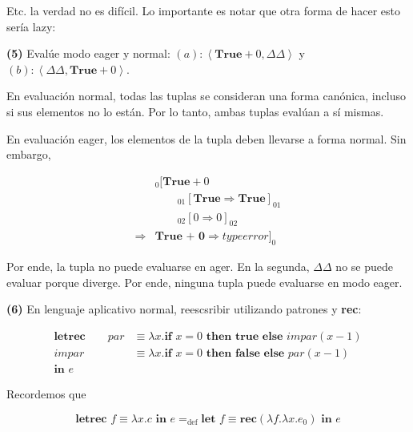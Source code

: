 \documentclass[article, 12pt]{article}
\begin{document}
Etc. la verdad no es difícil. Lo importante es notar que otra forma de hacer
esto sería lazy: 

\pagebreak 

\begin{myframe}
  \textbf{(5)} Evalúe modo eager y normal: $(a) : \left<\textbf{True} + 0, \Delta \Delta
  \right>$ y $(b) : \left<\Delta \Delta, \textbf{True} + 0 \right>$.
\end{myframe}

En evaluación normal, todas las tuplas se consideran una forma canónica, incluso
si sus elementos no lo están. Por lo tanto, ambas tuplas evalúan a sí mismas. 

En evaluación eager, los elementos de la tupla deben llevarse a forma normal.
Sin embargo, 

\begin{align*}
  &_{0}[\textbf{True} + 0 \\ 
  &\qquad _{01}[\textbf{True} \Rightarrow \textbf{True}]_{01}\\
  &\qquad _{02}[0 \Rightarrow 0]_{02} \\ 
  \Rightarrow &\textbf{True + 0} \Rightarrow typeerror]_0
\end{align*}

Por ende, la tupla no puede evaluarse en ager. En la segunda, $\Delta \Delta$
no se puede evaluar porque diverge. Por ende, ninguna tupla puede evaluarse en
modo eager.

\pagebreak 

\begin{myframe}
  \textbf{(6)} En lenguaje aplicativo normal, reescsribir utilizando patrones y
  \textbf{rec}: 

  \begin{align*}
    \textbf{letrec} \qquad par &\equiv \lambda x. 
    \textbf{if } x = 0 \textbf{ then true}
    \textbf{ else }impar(x-1) \\ 
                          impar &\equiv\lambda x.\textbf{if } x = 0 \textbf{ then false}
                          \textbf{ else } par(x-1) \\ 
                          \textbf{in } e
  \end{align*}
\end{myframe}

Recordemos que 

\begin{equation*}
  \textbf{letrec } f \equiv \lambda x.c \textbf{ in } e =_{\text{def}}
  \textbf{let }f
  \equiv \textbf{rec}(\lambda f. \lambda x. e_0) \textbf{ in } e
\end{equation*}
\end{document}
